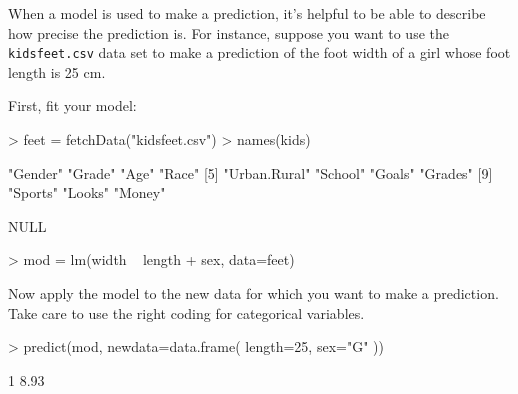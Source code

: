 
When a model is used to make a prediction, it's helpful to be able to
describe how precise the prediction is.  For instance, suppose you \datasetFeet
want to use the \texttt{kidsfeet.csv} data set to make a prediction of
the foot width of a girl whose foot length is 25 cm. 


First, fit your model:
\begin{Schunk}
\begin{Sinput}
> feet = fetchData("kidsfeet.csv")
> names(kids)
\end{Sinput}
\begin{Soutput}
 [1] "Gender"      "Grade"       "Age"         "Race"       
 [5] "Urban.Rural" "School"      "Goals"       "Grades"     
 [9] "Sports"      "Looks"       "Money"      
\end{Soutput}
\begin{Soutput}
NULL
\end{Soutput}
\begin{Sinput}
> mod = lm(width ~ length + sex, data=feet)
\end{Sinput}
\end{Schunk}

Now apply the model to the new data for which you want to make a
prediction.  Take care to use the right coding for categorical variables.
\begin{Schunk}
\begin{Sinput}
> predict(mod, newdata=data.frame( length=25, sex="G" ))
\end{Sinput}
\begin{Soutput}
   1 
8.93 
\end{Soutput}
\end{Schunk}

